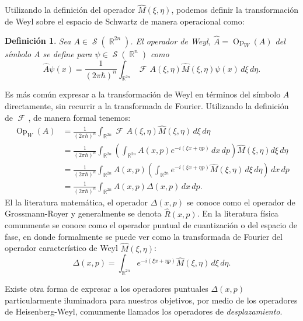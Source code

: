 \documentclass[a4paper]{report}
\DeclareMathOperator{\R}{\mathbb{R}}
\DeclareMathOperator{\Sz}{\mathcal S}
\DeclareMathOperator{\Op}{Op}
\DeclareMathOperator{\Fr}{\mathcal{F}\!}
\newtheorem{definition}{Definición}
\begin{document}
  Utilizando la definición del operador $\hat{M}(\xi,\eta)$,
  podemos definir la transformación de Weyl sobre el espacio
  de Schwartz de manera operacional como:
  \begin{definition}
    Sea $A \in \Sz(\R^{2n})$. El operador de Weyl, $\hat{A}
    = \Op_W(A)$ del símbolo $A$ se define para $\psi \in
    \Sz(\R^{n})$ como
    \begin{equation}
      \label{eqn:weyl_quant_2}
      \hat{A}\psi(x)
      = \frac{1}{(2\pi\hbar)^{n}}
      \int_{\R^{2n}} \Fr A(\xi,\eta) \hat{M}(\xi,\eta)
      \psi(x) \, d\xi \, d\eta.
    \end{equation}
  \end{definition}
  Es más común expresar a la transformación de Weyl en
  términos del símbolo $A$ directamente, sin recurrir a la
  transformada de Fourier. Utilizando la definición de
  $\Fr$, de manera formal tenemos:
  \begin{align*}
    \Op_W(A)
    &= \frac{1}{(2\pi\hbar)^{n}} \int_{\R^{2n}} \Fr
    A(\xi,\eta)\hat{M}(\xi,\eta) \, d\xi \, d\eta \\
    &= \frac{1}{(2\pi\hbar)^{n}} \int_{\R^{2n}} \left(
    \int_{\R^{2n}} A(x,p)e^{-i(\xi x + \eta p)} \, dx \, dp
    \right) \hat{M}(\xi,\eta) d\xi \, d\eta \\
    &= \frac{1}{(2\pi\hbar)^{n}} \int_{\R^{2n}} A(x,p)
    \left( \int_{\R^{2n}} e^{-i(\xi x + \eta p)}
    \hat{M}(\xi,\eta) \, d\xi \, d\eta \right) \, dx \, dp
    \\
    &= \frac{1}{(2\pi\hbar)^{n}} \int_{\R^{2n}} A(x,p)
    \Delta(x,p) \, dx \, dp.
  \end{align*} 
  El la literatura matemática, el operador $\Delta(x,p)$ se
  conoce como el operador de Grossmann-Royer y generalmente
  se denota $\hat{R}(x,p)$. En la literatura física
  comunmente se conoce como el operador puntual de
  cuantización o del espacio de fase, en donde formalmente
  se puede ver como la transformada de Fourier del operador
  característico de Weyl $\hat{M}(\xi,\eta)$:
  \begin{equation}
    \label{eqn:phase_point_operator}
    \Delta(x,p)
    = \int_{\R^{2n}} e^{-i(\xi x + \eta p)}
    \hat{M}(\xi,\eta) \, d\xi \, d\eta.
  \end{equation}

  Existe otra forma de expresar a los operadores puntuales
  $\Delta(x,p)$ particularmente iluminadora para nuestros
  objetivos, por medio de los operadores de Heisenberg-Weyl,
  comunmente llamados los operadores de
  \textit{desplazamiento}.
\end{document}
